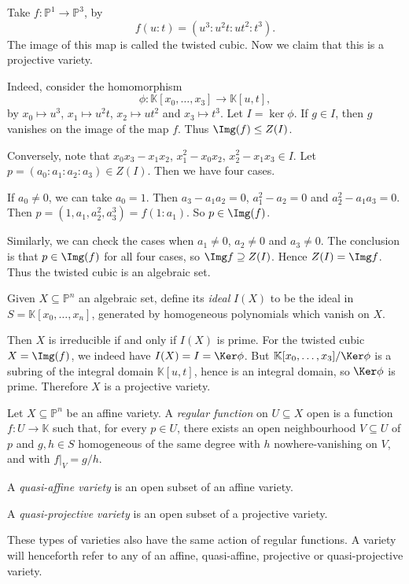 \documentclass[12pt]{article}
\begin{document}
\begin{exbox}
	Take $f : \mathbb{P}^1 \to \mathbb{P}^3$, by
	\[
	f(u : t) = (u^3 : u^2 t : ut^2 : t^3).
	\]
	The image of this map is called the twisted cubic. Now we claim that this is a projective variety.

	Indeed, consider the homomorphism
	\[
		\phi : \mathbb{K}[x_0, \ldots, x_3] \to \mathbb{K}[u, t],
	\]
	by $x_0 \mapsto u^3$, $x_1 \mapsto u^2t$, $x_2 \mapsto ut^2$ and $x_3 \mapsto t^3$. Let $I = \ker \phi$. If $g \in I$, then $g$ vanishes on the image of the map $f$. Thus $\Img(f) \leq Z(I)$.

	Conversely, note that $x_0 x_3 - x_1 x_2$, $x_1^2 - x_0x_2$, $x_2^2 - x_1x_3 \in I$. Let $p = (a_0 : a_1 : a_2: a_3) \in Z(I)$. Then we have four cases.

	If $a_0 \neq 0$, we can take $a_0 = 1$. Then $a_3 - a_1 a_2 = 0$, $a_1^2 - a_2 = 0$ and $a_2^2 - a_1a_3= 0$. Then $p = (1, a_1, a_2^2, a_3^3) = f(1 : a_1)$. So $p \in \Img(f)$.

	Similarly, we can check the cases when $a_1 \neq 0$, $a_2 \neq 0$ and $a_3 \neq 0$. The conclusion is that $p \in \Img(f)$ for all four cases, so $\Img f \supseteq Z(I)$. Hence $Z(I) = \Img f$. Thus the twisted cubic is an algebraic set.
\end{exbox}

Given $X \subseteq \mathbb{P}^n$ an algebraic set, define its \emph{ideal} $I(X)$ to be the ideal in $S = \mathbb{K}[x_0, \ldots, x_n]$, generated by homogeneous polynomials which vanish on $X$.

Then $X$ is irreducible if and only if $I(X)$ is prime. For the twisted cubic $X = \Img(f)$, we indeed have $I(X) = I = \Ker \phi$. But $\mathbb{K}[x_0, \ldots, x_3]/\Ker \phi$ is a subring of the integral domain $\mathbb{K}[u, t]$, hence is an integral domain, so $\Ker \phi$ is prime. Therefore $X$ is a projective variety.

\begin{definition}
	Let $X \subseteq \mathbb{P}^n$ be an affine variety. A \emph{regular function} on $U \subseteq X$ open is a function $f : U \to \mathbb{K}$ such that, for every $p \in U$, there exists an open neighbourhood $V \subseteq U$ of $p$ and $g, h \in S$ homogeneous of the same degree with $h$ nowhere-vanishing on $V$, and with $f|_V = g/h$.
\end{definition}

\begin{definition}
	A \emph{quasi-affine variety} is an open subset of an affine variety.

	A \emph{quasi-projective variety} is an open subset of a projective variety.

	These types of varieties also have the same action of regular functions. A variety will henceforth refer to any of an affine, quasi-affine, projective or quasi-projective variety.
\end{definition}
\end{document}

